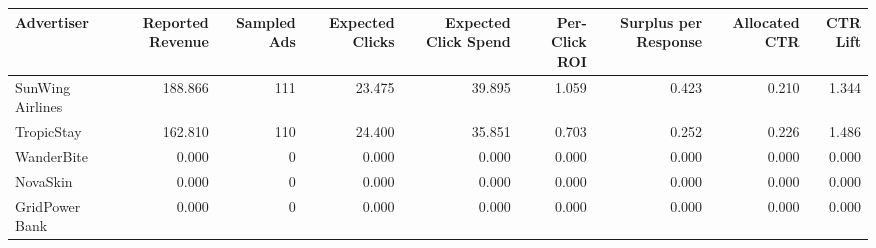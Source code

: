 \begin{tabular}{lrrrrrrrr}
\hline
Advertiser & Reported Revenue & Sampled Ads & Expected Clicks & Expected Click Spend & Per-Click ROI & Surplus per Response & Allocated CTR & CTR Lift \\
\hline
SunWing Airlines & 188.866 & 111 & 23.475 & 39.895 & 1.059 & 0.423 & 0.210 & 1.344 \\
TropicStay & 162.810 & 110 & 24.400 & 35.851 & 0.703 & 0.252 & 0.226 & 1.486 \\
WanderBite & 0.000 & 0 & 0.000 & 0.000 & 0.000 & 0.000 & 0.000 & 0.000 \\
NovaSkin & 0.000 & 0 & 0.000 & 0.000 & 0.000 & 0.000 & 0.000 & 0.000 \\
GridPower Bank & 0.000 & 0 & 0.000 & 0.000 & 0.000 & 0.000 & 0.000 & 0.000 \\
\hline
\end{tabular}
